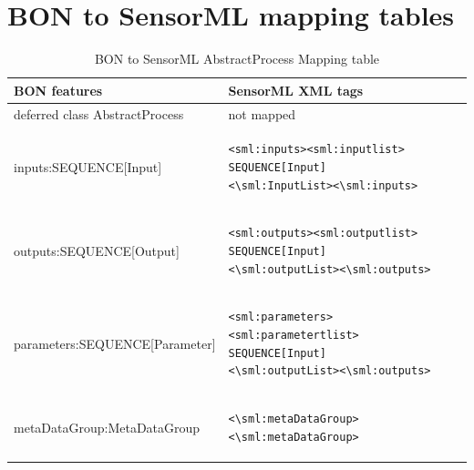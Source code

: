 \documentclass[]{final_report}
\begin{document}
\section {BON to SensorML mapping tables} \label{appenBSMLBONTables}
\lstset{frame=none}
\begin{table}[!th]
\centering
\begin{tabular}{|l|l|}
\hline
BON features & SensorML XML tags\\
\hline
   deferred class AbstractProcess  & not mapped\\
\hline     
     inputs:SEQUENCE[Input] & \begin{lstlisting}
<sml:inputs><sml:inputlist>
SEQUENCE[Input]
<\sml:InputList><\sml:inputs>\end{lstlisting}\\

\hline 
     outputs:SEQUENCE[Output] & \begin{lstlisting}
<sml:outputs><sml:outputlist>
SEQUENCE[Input]
<\sml:outputList><\sml:outputs>\end{lstlisting}\\
\hline
     parameters:SEQUENCE[Parameter] & \begin{lstlisting}
<sml:parameters><sml:parametertlist>
SEQUENCE[Input]
<\sml:outputList><\sml:outputs>\end{lstlisting}\\

\hline                 
     metaDataGroup:MetaDataGroup &  \begin{lstlisting}
<\sml:metaDataGroup><\sml:metaDataGroup>\end{lstlisting}\\
 \hline    

\end{tabular}
\caption{BON to SensorML AbstractProcess Mapping table}\label{table:bon_sml_example}
\label{ex:table}
\end{table}
\end{document}
